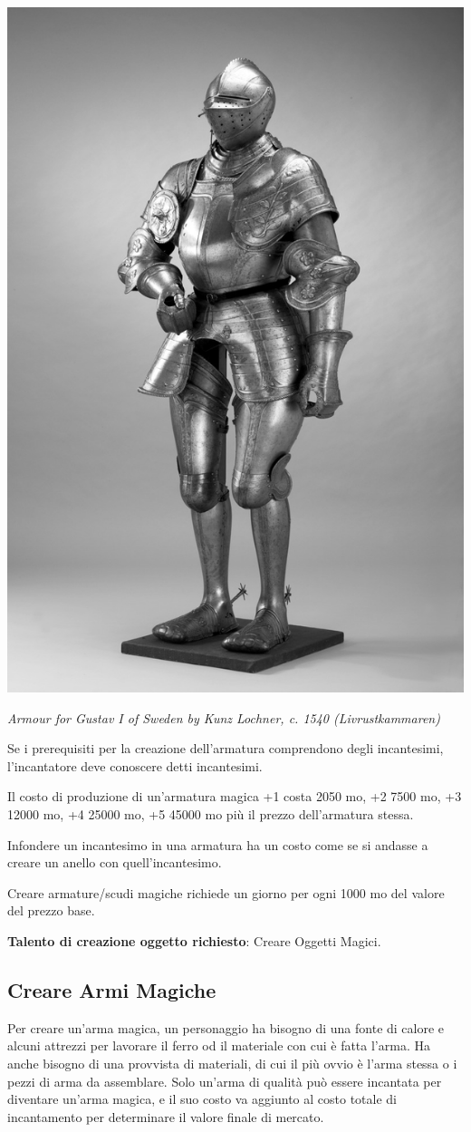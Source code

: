\begin{multicols}{2}
\begin{center}
\includegraphics[width=0.5\linewidth]{immagini/Rustning_Gustav_Vasa.png}

\textit{Armour for Gustav I of Sweden by Kunz Lochner, c. 1540 (Livrustkammaren)}
\end{center}

Se i prerequisiti per la creazione dell'armatura comprendono degli incantesimi, l'incantatore deve conoscere detti incantesimi.

Il costo di produzione di un'armatura magica +1 costa 2050 mo, +2 7500 mo, +3 12000 mo, +4 25000 mo, +5 45000 mo più il prezzo dell'armatura stessa.

Infondere un incantesimo in una armatura ha un costo come se si andasse a creare un anello con quell'incantesimo.

Creare armature/scudi magiche richiede un giorno per ogni 1000 mo del valore del prezzo base.

\medskip

\textbf{Talento di creazione oggetto richiesto}: Creare Oggetti Magici.

\subsection{Creare Armi Magiche}

Per creare un'arma magica, un personaggio ha bisogno di una fonte di calore e alcuni attrezzi per lavorare il ferro od il materiale con cui è fatta l'arma. Ha anche bisogno di una provvista di materiali, di cui il più ovvio è l'arma stessa o i pezzi di arma da assemblare. Solo un'arma di qualità può essere incantata per diventare un'arma magica, e il suo costo va aggiunto al costo totale di incantamento per determinare il valore finale di mercato.


\end{multicols}

